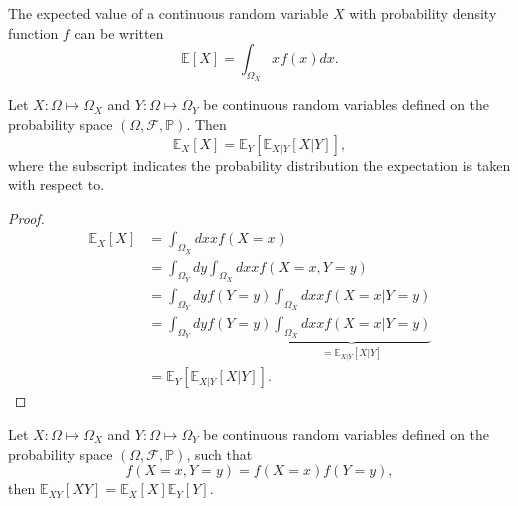 \begin{theorem}
	\label{theorem:expectaion_continuous}
	The expected value of a continuous random variable $X$ with probability density function $f$ can be written 
	\begin{equation}
		\mathbb{E}[X]=\int_{\Omega_X}xf(x)dx.
	\end{equation}
\end{theorem}
\begin{theorem}
	\label{theorem:total_expectation}
	Let $X: \Omega \mapsto \Omega_X$ and $Y: \Omega \mapsto \Omega_Y$ be continuous random variables defined on the probability space $(\Omega, \mathcal{F}, \mathbb{P})$. Then
	\begin{equation}
		\mathbb{E}_X[X] = \mathbb{E}_Y[\mathbb{E}_{X|Y}[X| Y]],
	\end{equation}
	where the subscript indicates the probability distribution the expectation is taken with respect to.
\end{theorem}
\begin{proof}
	\begin{equation}
		\begin{split}
			\mathbb{E}_X[X] &= \int_{\Omega_X} dx x f(X=x)\\
			& = \int_{\Omega_Y} dy\int_{\Omega_X}dx x f(X=x,Y=y)\\
			& =  \int_{\Omega_Y} dy f(Y=y) \int_{\Omega_X}dx x f(X=x|Y=y)\\
			& =  \int_{\Omega_Y} dy f(Y=y) \underbrace{\int_{\Omega_X}dx x f(X=x|Y=y)}_{= \mathbb{E}_{X|Y}[X|Y]}\\
			& = \mathbb{E}_Y[\mathbb{E}_{X|Y}[X|Y]].
		\end{split}
	\end{equation}
\end{proof}

\begin{theorem}
	\label{theorem:expectation_independent}
	Let $X: \Omega \mapsto \Omega_X$ and $Y: \Omega \mapsto \Omega_Y$ be continuous random variables defined on the probability space $(\Omega, \mathcal{F}, \mathbb{P})$, such that
	\begin{equation}
	f(X=x,Y=y)=f(X=x)f(Y=y),	
	\end{equation}
	then $\mathbb{E}_{XY}[XY]=\mathbb{E}_X[X]\mathbb{E}_Y[Y]$.
\end{theorem}

